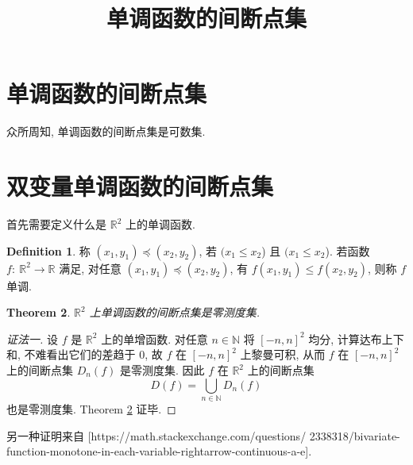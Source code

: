 \documentclass[a4paper,11pt]{article}
\title{单调函数的间断点集}
\newtheorem{theorem}{Theorem}[section]
\theoremstyle{definition}
\newtheorem{definition}[theorem]{Definition}
\begin{document}
\maketitle

\section{单调函数的间断点集}

众所周知, 单调函数的间断点集是可数集.

\section{双变量单调函数的间断点集}

首先需要定义什么是 $ \mathbb{R}^2 $ 上的单调函数.

\begin{definition}
    称 $ (x_1, y_1) \preceq (x_2, y_2) $, 若 $( x_1 \leq x_2 $) 且 $( x_1 \leq x_2 $).
    若函数 $ f :\ \mathbb{R}^2 \to \mathbb{R} $ 满足, 
    对任意 $ (x_1, y_1) \preceq (x_2, y_2) $, 有 $ f(x_1, y_1) \leq f(x_2, y_2) $, 则称 $ f $ 单调.
\end{definition}

\begin{theorem} \label{3}
    $ \mathbb{R}^2 $ 上单调函数的间断点集是零测度集.
\end{theorem}

\begin{proof}[证法一]
    设 $ f $ 是 $ \mathbb{R}^2 $ 上的单增函数. 对任意 $ n \in \mathbb{N} $
    将 $ [-n, n]^2 $ 均分, 计算达布上下和, 不难看出它们的差趋于 $ 0 $, 故 $ f $ 在 $ [-n, n]^2 $ 上黎曼可积,
    从而 $ f $ 在 $ [-n, n]^2 $ 上的间断点集 $ D_n(f) $ 是零测度集.
    因此 $ f $ 在 $ \mathbb{R}^2 $ 上的间断点集 
    $$
        D(f) = \bigcup_{n \in \mathbb{N}} D_n(f)
    $$
    也是零测度集. Theorem \ref{3} 证毕.
\end{proof}

另一种证明来自 [https://math.stackexchange.com/questions/
2338318/bivariate-function-monotone-in-each-variable-rightarrow-continuous-a-e].
\end{document}
